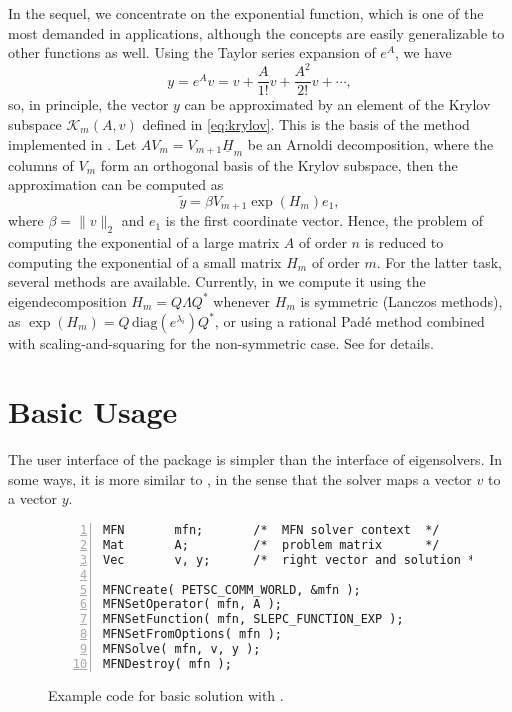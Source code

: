 In the sequel, we concentrate on the exponential function, which is one of the most demanded in applications, although the concepts are easily generalizable to other functions as well. Using the Taylor series expansion of $e^A$, we have
\begin{equation}
y=e^Av=v+\frac{A}{1!}v+\frac{A^2}{2!}v+\cdots,
\end{equation}
so, in principle, the vector $y$ can be approximated by an element of the Krylov subspace $\mathcal{K}_m(A,v)$ defined in \eqref{eq:krylov}. This is the basis of the method implemented in \expokit \citep{Sidje:1998:ESP}. Let $AV_m=V_{m+1}\underline{H}_m$ be an Arnoldi decomposition, where the columns of $V_m$ form an orthogonal basis of the Krylov subspace, then the approximation can be computed as
\begin{equation}
\tilde y=\beta V_{m+1}\exp(H_m)e_1,
\end{equation}
where $\beta=\|v\|_2$ and $e_1$ is the first coordinate vector. Hence, the problem of computing the exponential of a large matrix $A$ of order $n$ is reduced to computing the exponential of a small matrix $H_m$ of order $m$. For the latter task, several methods are available. Currently, in \slepc we compute it using the eigendecomposition $H_m=Q\Lambda Q^*$ whenever $H_m$ is symmetric (Lanczos methods), as $\exp(H_m)=Q\,\mathrm{diag}(e^{\lambda_i})Q^*$, or using a rational Pad\'e method combined with scaling-and-squaring for the non-symmetric case. See \citep{Higham:2010:CMF} for details.

\section{Basic Usage}

The user interface of the  package is simpler than the interface of eigensolvers. In some ways, it is more similar to , in the sense that the solver maps a vector $v$ to a vector $y$. 

\begin{figure}
\begin{Verbatim}[fontsize=\small,numbers=left,numbersep=6pt,xleftmargin=15mm]
MFN       mfn;       /*  MFN solver context  */
Mat       A;         /*  problem matrix      */
Vec       v, y;      /*  right vector and solution */

MFNCreate( PETSC_COMM_WORLD, &mfn );
MFNSetOperator( mfn, A );
MFNSetFunction( mfn, SLEPC_FUNCTION_EXP );
MFNSetFromOptions( mfn );
MFNSolve( mfn, v, y );
MFNDestroy( mfn );
\end{Verbatim}
\caption{\label{fig:ex-mfn}Example code for basic solution with .}
\end{figure}

